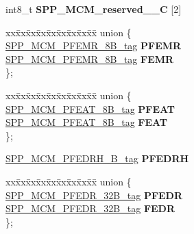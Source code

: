 \begin{DoxyCompactItemize}
\begin{tabbing}
\end{tabbing}\item 
\mbox{\label{structSPP__MCM__struct__tag_ada46b8af01179a2d842b84c0062ca085}} 
int8\+\_\+t {\bfseries S\+P\+P\+\_\+\+M\+C\+M\+\_\+reserved\+\_\+\_\+C} \mbox{[}2\mbox{]}
\item 
\mbox{\label{structSPP__MCM__struct__tag_a57f701c5b0c250cfdad861d645e408a1}} 
\begin{tabbing}
xx\=xx\=xx\=xx\=xx\=xx\=xx\=xx\=xx\=\kill
union \{\\
\>\mbox{\hyperlink{unionSPP__MCM__PFEMR__8B__tag}{SPP\_MCM\_PFEMR\_8B\_tag}} {\bfseries PFEMR}\\
\>\mbox{\hyperlink{unionSPP__MCM__PFEMR__8B__tag}{SPP\_MCM\_PFEMR\_8B\_tag}} {\bfseries FEMR}\\
\}; \\

\end{tabbing}\item 
\mbox{\label{structSPP__MCM__struct__tag_ad5e07bd44c0028bcdaaa4c0e126d3cf8}} 
\begin{tabbing}
xx\=xx\=xx\=xx\=xx\=xx\=xx\=xx\=xx\=\kill
union \{\\
\>\mbox{\hyperlink{unionSPP__MCM__PFEAT__8B__tag}{SPP\_MCM\_PFEAT\_8B\_tag}} {\bfseries PFEAT}\\
\>\mbox{\hyperlink{unionSPP__MCM__PFEAT__8B__tag}{SPP\_MCM\_PFEAT\_8B\_tag}} {\bfseries FEAT}\\
\}; \\

\end{tabbing}\item 
\mbox{\label{structSPP__MCM__struct__tag_a93e636e9bdb21a20996ff8262aabfb48}} 
\mbox{\hyperlink{unionSPP__MCM__PFEDRH__32B__tag}{S\+P\+P\+\_\+\+M\+C\+M\+\_\+\+P\+F\+E\+D\+R\+H\+\_\+B\+\_\+tag}} {\bfseries P\+F\+E\+D\+RH}
\item 
\mbox{\label{structSPP__MCM__struct__tag_a9d1c36f54555f117f05d9f0d77ab545f}} 
\begin{tabbing}
xx\=xx\=xx\=xx\=xx\=xx\=xx\=xx\=xx\=\kill
union \{\\
\>\mbox{\hyperlink{unionSPP__MCM__PFEDR__32B__tag}{SPP\_MCM\_PFEDR\_32B\_tag}} {\bfseries PFEDR}\\
\>\mbox{\hyperlink{unionSPP__MCM__PFEDR__32B__tag}{SPP\_MCM\_PFEDR\_32B\_tag}} {\bfseries FEDR}\\
\}; \\


\end{tabbing}
\end{DoxyCompactItemize}
